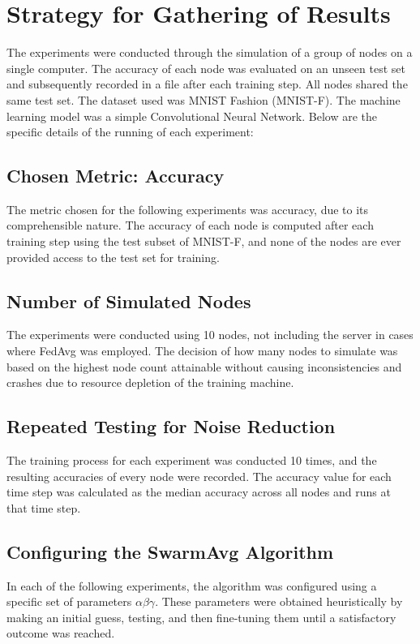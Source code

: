 \documentclass[letterpaper, 10 pt, conference]{ieeeconf}  %
\begin{document}
\section{Strategy for Gathering of Results}\label{strats}
The experiments were conducted through the simulation of a group of nodes on a single computer. The accuracy of each node was evaluated on an unseen test set and subsequently recorded in a file after each training step. All nodes shared the same test set. The dataset used was MNIST Fashion (MNIST-F). The machine learning model was a simple Convolutional Neural Network. Below are the specific details of the running of each experiment:

\subsection{Chosen Metric: Accuracy}
The metric chosen for the following experiments was accuracy, due to its comprehensible nature. The accuracy of each node is computed after each training step using the test subset of MNIST-F, and none of the nodes are ever provided access to the test set for training.

\subsection{Number of Simulated Nodes}
The experiments were conducted using 10 nodes, not including the server in cases where FedAvg was employed. The decision of how many nodes to simulate was based on the highest node count attainable without causing inconsistencies and crashes due to resource depletion of the training machine.

\subsection{Repeated Testing for Noise Reduction}
The training process for each experiment was conducted 10 times, and the resulting accuracies of every node were recorded. The accuracy value for each time step was calculated as the median accuracy across all nodes and runs at that time step.

\subsection{Configuring the SwarmAvg Algorithm}
In each of the following experiments, the algorithm was configured using a specific set of parameters $\alpha \beta \gamma$. These parameters were obtained heuristically by making an initial guess, testing, and then fine-tuning them until a satisfactory outcome was reached.
\end{document}

